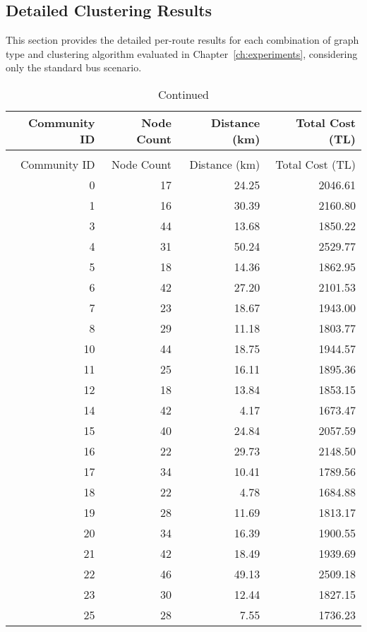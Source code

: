 \begin{appendix}
\section{Detailed Clustering Results}
\label{sec:appendix_detailed_results}

This section provides the detailed per-route results for each combination of graph type and clustering algorithm evaluated in Chapter~\ref{ch:experiments}, considering only the standard bus scenario.

\begin{longtable}{rrrr}
\caption{Detailed Results for Leiden Clustering on Complete Graph (Only Buses)}
\label{tab:appendix_leiden_complete} \\
\toprule
Community ID & Node Count & Distance (km) & Total Cost (TL) \\
\midrule
\endfirsthead
\caption[]{Continued} \\
\toprule
Community ID & Node Count & Distance (km) & Total Cost (TL) \\
\midrule
0 & 17 & 24.25 & 2046.61 \\
1 & 16 & 30.39 & 2160.80 \\
3 & 44 & 13.68 & 1850.22 \\
4 & 31 & 50.24 & 2529.77 \\
5 & 18 & 14.36 & 1862.95 \\
6 & 42 & 27.20 & 2101.53 \\
7 & 23 & 18.67 & 1943.00 \\
8 & 29 & 11.18 & 1803.77 \\
10 & 44 & 18.75 & 1944.57 \\
11 & 25 & 16.11 & 1895.36 \\
12 & 18 & 13.84 & 1853.15 \\
14 & 42 & 4.17 & 1673.47 \\
15 & 40 & 24.84 & 2057.59 \\
16 & 22 & 29.73 & 2148.50 \\
17 & 34 & 10.41 & 1789.56 \\
18 & 22 & 4.78 & 1684.88 \\
19 & 28 & 11.69 & 1813.17 \\
20 & 34 & 16.39 & 1900.55 \\
21 & 42 & 18.49 & 1939.69 \\
22 & 46 & 49.13 & 2509.18 \\
23 & 30 & 12.44 & 1827.15 \\
25 & 28 & 7.55 & 1736.23 \\

\end{longtable}
\end{appendix}
